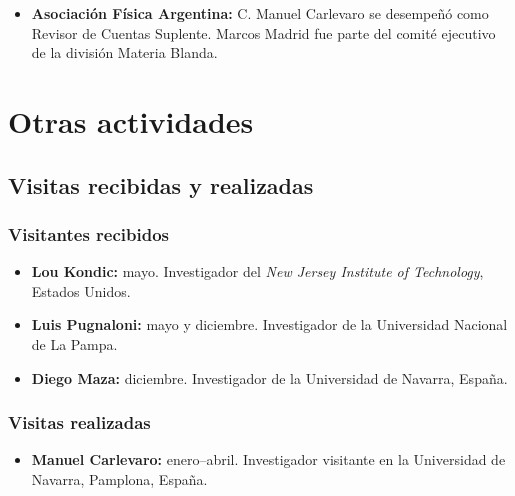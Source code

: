 \documentclass[a4paper,11pt,twoside,final,titlepage,onecolumn,openright]{report}
\begin{document}
\begin{itemize}
 
\item \textbf{Asociación Física Argentina:} C. Manuel Carlevaro se desempeñó como Revisor de Cuentas Suplente. Marcos Madrid fue parte del comité ejecutivo de la división Materia Blanda.
 
\end{itemize}


\section{Otras actividades}

\subsection{Visitas recibidas y realizadas}

\subsubsection{Visitantes recibidos}

\begin{itemize}
 \item \textbf{Lou Kondic:} mayo. Investigador del \textit{New Jersey Institute of Technology}, Estados Unidos.
 \item {\bf Luis Pugnaloni:} mayo y diciembre. Investigador de la Universidad Nacional de La Pampa.
 \item {\bf Diego Maza:} diciembre. Investigador de la Universidad de Navarra, España.
\end{itemize}

\subsubsection{Visitas realizadas}
 
 \begin{itemize}
  \item {\bf Manuel Carlevaro:} enero--abril. Investigador visitante en la Universidad de Navarra, Pamplona, España.
 \end{itemize}
\end{document}
